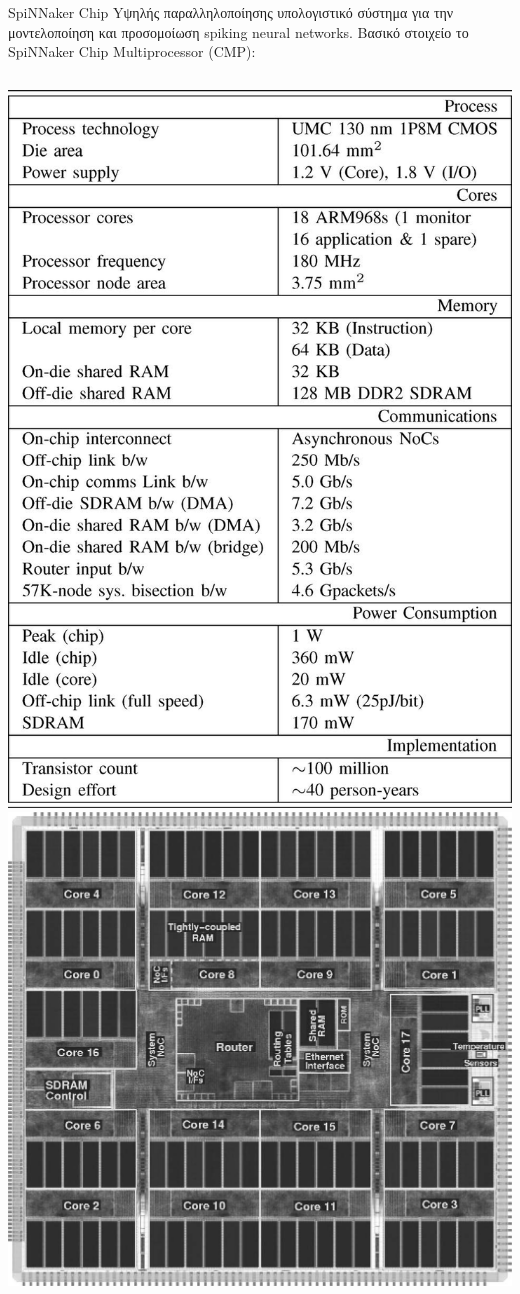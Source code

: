 \documentclass[11pt,center]{beamer}
\begin{document}
	\begin{frame}{SpiNNaker Chip}
		Yψηλής παραλληλοποίησης υπολογιστικό σύστημα για την μοντελοποίηση και προσομοίωση spiking 				neural networks.
		\pause
		\vfill
		Βασικό στοιχείο το SpiNNaker Chip Multiprocessor (CMP):
		\vfill
		\begin{columns}
			\includegraphics[width=0.75 \textwidth,right]{../pics/CMPspecs.jpg}
			\includegraphics[width=0.75 \textwidth,left]{../pics/CMP.jpg}
		\end{columns}
	\end{frame}
\end{document}
